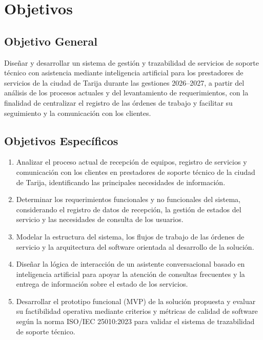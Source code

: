 \section{Objetivos}

\subsection{Objetivo General}

Diseñar y desarrollar un sistema de gestión y trazabilidad de servicios de soporte técnico con asistencia mediante inteligencia artificial para los prestadores de servicios de la ciudad de Tarija durante las gestiones 2026--2027, a partir del análisis de los procesos actuales y del levantamiento de requerimientos, con la finalidad de centralizar el registro de las órdenes de trabajo y facilitar su seguimiento y la comunicación con los clientes.

\subsection{Objetivos Específicos}

\begin{enumerate}
    \item Analizar el proceso actual de recepción de equipos, registro de servicios y comunicación con los clientes en prestadores de soporte técnico de la ciudad de Tarija, identificando las principales necesidades de información.
    \item Determinar los requerimientos funcionales y no funcionales del sistema, considerando el registro de datos de recepción, la gestión de estados del servicio y las necesidades de consulta de los usuarios.
    \item Modelar la estructura del sistema, los flujos de trabajo de las órdenes de servicio y la arquitectura del software orientada al desarrollo de la solución.
    \item Diseñar la lógica de interacción de un asistente conversacional basado en inteligencia artificial para apoyar la atención de consultas frecuentes y la entrega de información sobre el estado de los servicios.
    \item Desarrollar el prototipo funcional (MVP) de la solución propuesta y evaluar su factibilidad operativa mediante criterios y métricas de calidad de software según la norma ISO/IEC 25010:2023 para validar el sistema de trazabilidad de soporte técnico.
\end{enumerate}